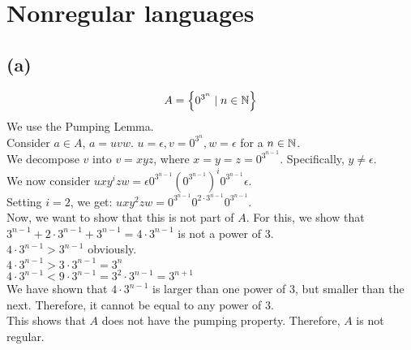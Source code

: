 

\setcounter{section}{1}


\section{Nonregular languages}

\subsection{(a)}
$$A = \left\{ 0^{3^{n}} \mid n \in \mathbb{N} \right\}$$
We use the Pumping Lemma.\\
Consider $a \in A$, $a = uvw$. $u=\epsilon, v=0^{3^{n}}, w=\epsilon$ for a $n \in \mathbb{N}$.\\
We decompose $v$ into $v=xyz$, where $x=y=z=0^{3^{n-1}}$. Specifically, $y\neq\epsilon$.\\
We now consider $uxy^{i}zw = \epsilon 0^{3^{n-1}} ( 0^{3^{n-1}})^{i} 0^{3^{n-1}} \epsilon$.\\
Setting $i=2$, we get: $uxy^{2}zw=0^{3^{n-1}}0^{2\cdot3^{n-1}}0^{3^{n-1}}$.\\
Now, we want to show that this is not part of $A$. For this, we show that $3^{n-1}+2\cdot 3^{n-1} + 3^{n-1} = 4\cdot 3^{n-1}$ is not a power of $3$.\\
$4\cdot 3^{n-1} > 3^{n-1}$ obviously.\\
$4\cdot 3^{n-1} > 3\cdot 3^{n-1} = 3^{n}$\\
$4\cdot 3^{n-1} < 9\cdot 3^{n-1} = 3^{2}\cdot 3^{n-1} = 3^{n+1}$\\
We have shown that $4\cdot 3^{n-1}$ is larger than one power of $3$, but smaller than the next. Therefore, it cannot be equal to any power of $3$.\\
This shows that $A$ does not have the pumping property. Therefore, $A$ is not regular.


